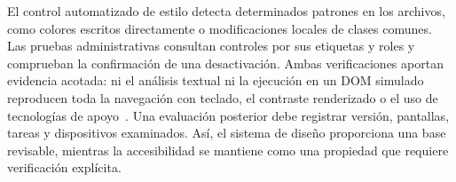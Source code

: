 El control automatizado de estilo detecta determinados patrones en los archivos,
como colores escritos directamente o modificaciones locales de clases comunes.
Las pruebas administrativas consultan controles por sus etiquetas y roles y
comprueban la confirmación de una desactivación. Ambas verificaciones aportan
evidencia acotada: ni el análisis textual ni la ejecución en un DOM simulado
reproducen toda la navegación con teclado, el contraste renderizado o el uso de
tecnologías de apoyo~\cite{codex_scde_design_evidence}. Una evaluación posterior
debe registrar versión, pantallas, tareas y dispositivos examinados. Así, el
sistema de diseño proporciona una base revisable, mientras la accesibilidad se
mantiene como una propiedad que requiere verificación explícita.
